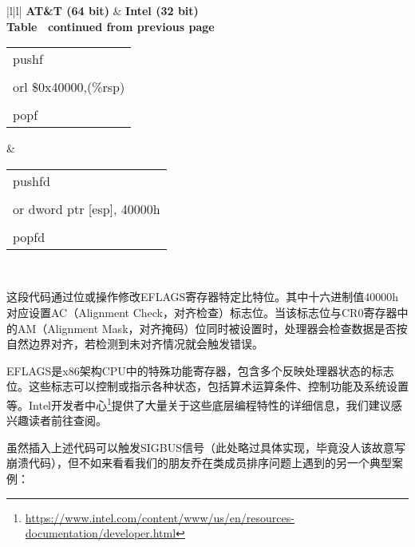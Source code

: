 \begin{longtable}{|l|l|}
\hline
\textbf{AT\&T (64 bit)} &
  \textbf{Intel (32 bit)} \\ \hline
\endfirsthead
%
%
{{\bfseries Table \thetable\ continued from previous page}} \\
\endhead
%
\begin{tabular}[c]{@{}l@{}}pushf \\ \\ orl \$0x40000,(\%rsp) \\ \\ popf\end{tabular} &
  \begin{tabular}[c]{@{}l@{}}pushfd\\ \\ or dword ptr {[}esp{]}, 40000h \\ \\ popfd\end{tabular} \\ \hline
\end{longtable}

这段代码通过位或操作修改EFLAGS寄存器特定比特位。其中十六进制值40000h对应设置AC（Alignment Check，对齐检查）标志位。当该标志位与CR0寄存器中的AM（Alignment Mask，对齐掩码）位同时被设置时，处理器会检查数据是否按自然边界对齐，若检测到未对齐情况就会触发错误。

EFLAGS是x86架构CPU中的特殊功能寄存器，包含多个反映处理器状态的标志位。这些标志可以控制或指示各种状态，包括算术运算条件、控制功能及系统设置等。Intel开发者中心\footnote{\url{https://www.intel.com/content/www/us/en/resources-documentation/developer.html}}提供了大量关于这些底层编程特性的详细信息，我们建议感兴趣读者前往查阅。

虽然插入上述代码可以触发SIGBUS信号（此处略过具体实现，毕竟没人该故意写崩溃代码），但不如来看看我们的朋友乔在类成员排序问题上遇到的另一个典型案例：
